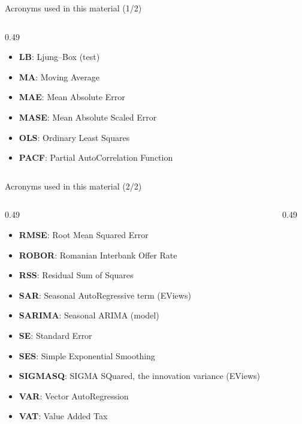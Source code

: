 \begin{frame}{Acronyms used in this material (1/2)}
\begin{columns}[T]
\begin{column}{0.49\textwidth}
\begin{itemize}
    \item \textbf{LB}: Ljung–Box (test)
    \item \textbf{MA}: Moving Average
    \item \textbf{MAE}: Mean Absolute Error
    \item \textbf{MASE}: Mean Absolute Scaled Error
    \item \textbf{OLS}: Ordinary Least Squares
    \item \textbf{PACF}: Partial AutoCorrelation Function
\end{itemize}
\end{column}
\end{columns}
\end{frame}
\begin{frame}{Acronyms used in this material (2/2)}
\begin{columns}[T]
\begin{column}{0.49\textwidth}
\begin{itemize}\setlength{\itemsep}{0pt}
    \item \textbf{RMSE}: Root Mean Squared Error
    \item \textbf{ROBOR}: Romanian Interbank Offer Rate
    \item \textbf{RSS}: Residual Sum of Squares
    \item \textbf{SAR}: Seasonal AutoRegressive term (EViews)
    \item \textbf{SARIMA}: Seasonal ARIMA (model)
    \item \textbf{SE}: Standard Error
    \item \textbf{SES}: Simple Exponential Smoothing
    \item \textbf{SIGMASQ}: SIGMA SQuared, the innovation variance (EViews)
    \item \textbf{VAR}: Vector AutoRegression
    \item \textbf{VAT}: Value Added Tax
\end{itemize}
\end{column}
\begin{column}{0.49\textwidth}
\end{column}
\end{columns}
\end{frame}

